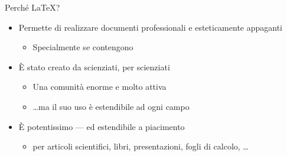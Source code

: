 \documentclass{beamer}
\subtitle{Parte 1: Le basi}
\begin{document}
\begin{frame}
\titlepage
\end{frame}

\begin{frame}{Perch\'e \LaTeX{}?}
\begin{itemize}
\item Permette di realizzare documenti professionali e esteticamente appaganti
\begin{itemize}
\item Specialmente se contengono 
\end{itemize}
%
\item \`E stato creato da scienziati, per scienziati
\begin{itemize}
\item Una comunit\`a enorme e molto attiva
\item \ldots ma il suo uso \`e estendibile ad ogni campo
\end{itemize}
%
\item \`E potentissimo --- ed estendibile a piacimento
\begin{itemize}
\item {} per articoli scientifici, libri, presentazioni,
fogli di calcolo, \ldots
\end{itemize}
\end{itemize}
\end{frame}
\end{document}
